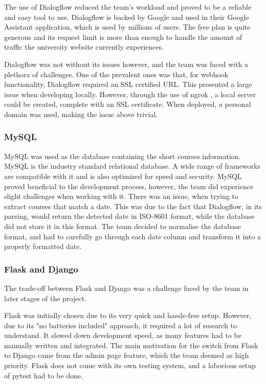 \documentclass{l3proj}
\begin{document}
The use of Dialogflow reduced the team's workload and proved to be a reliable and easy tool to use. Dialogflow is backed by Google and used in their Google Assistant application, which is used by millions of users. The free plan is quite generous and its request limit is more than enough to handle the amount of traffic the university website currently experiences.

Dialogflow was not without its issues however, and the team was faced with a plethora of challenges. One of the prevalent ones was that, for webhook functionality, Dialogflow required an SSL certified URL. This presented a large issue when developing locally. However, through the use of ngrok \cite{NGROK}, a local server could be created, complete with an SSL certificate. When deployed, a personal domain \cite{ANGUELCOUK} was used, making the issue above trivial.


\subsubsection{MySQL}
\label{subsubsec:mysql}
MySQL was used as the database containing the short courses information. MySQL is the industry standard relational database. A wide range of frameworks are compatible with it and is also optimized for speed and security. MySQL proved beneficial to the development process, however, the team did experience slight challenges when working with it. There was an issue, when trying to extract courses that match a date. This was due to the fact that Dialogflow, in its parsing, would return the detected date in ISO-8601 \cite{DATEISO} \cite{DFDATE} format, while the database did not store it in this format. The team decided to normalise the database format, and had to carefully go through each date column and transform it into a properly formatted date.

\subsubsection{Flask and Django}
\label{subsubsec:flaskdjango}
The trade-off between Flask and Django was a challenge faced by the team in later stages of the project.

Flask was initially chosen due to its very quick and hassle-free setup. However, due to its "no batteries included" approach, it required a lot of research to understand. It slowed down development speed, as many features had to be manually written and integrated. The main motivation for the switch from Flask to Django came from the admin page feature, which the team deemed as high priority. Flask does not come with its own testing system, and a laborious setup of pytest had to be done.
\end{document}
